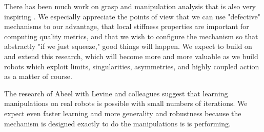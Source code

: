There has been much work on grasp and manipulation analysis that is also very inspiring \cite{trinkle1990planning,prattichizzo2013motion,prattichizzo1997consistent,lin2000stiffness}.  We especially appreciate the points of view that we can use "defective" mechanisms to our advantage, that local stiffness properties are important for computing quality metrics, and that we wish to configure the mechanism so that abstractly "if we just squeeze," good things will happen.    We expect to build on and extend this research, which will become more and more valuable as we build robots which exploit limits, singularities, asymmetries, and highly coupled action as a matter of course.

The research of Abeel with Levine and colleagues \cite{finn2015deep,kumaroptimal,levine2015learning} suggest that learning manipulations on real robots is possible with small numbers of iterations.   We expect even faster learning and more generality and robustness because the mechanism is designed exactly to do the manipulations is is performing.